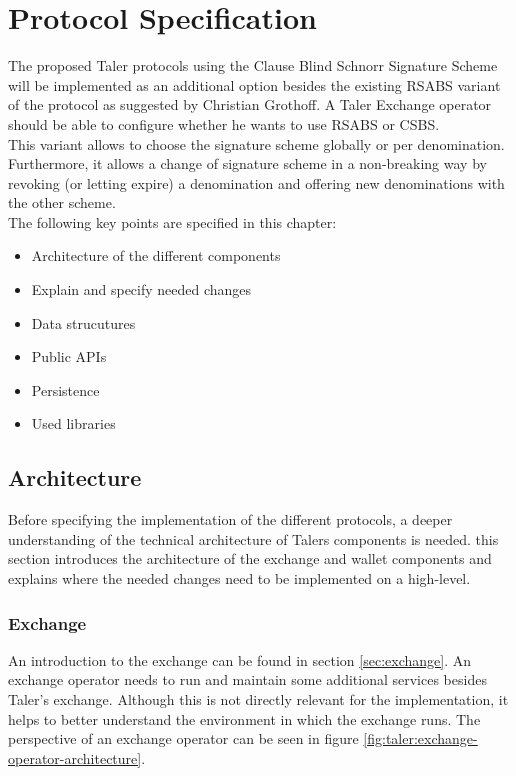 \chapter{Protocol Specification}
\label{chap:spec}
The proposed Taler protocols using the Clause Blind Schnorr Signature Scheme will be implemented as an additional option besides the existing \gls{RSABS} variant of the protocol as suggested by Christian Grothoff.
A Taler Exchange operator should be able to configure whether he wants to use \gls{RSABS} or \gls{CSBS}.
\\This variant allows to choose the signature scheme globally or per denomination.
Furthermore, it allows a change of signature scheme in a non-breaking way by revoking (or letting expire) a denomination and offering new denominations with the other scheme.
\\
The following key points are specified in this chapter:
\begin{itemize}
  \item Architecture of the different components
  \item Explain and specify needed changes
  \item Data strucutures
  \item Public \acp{API}
  \item Persistence
  \item Used libraries
\end{itemize}

\section{Architecture}
Before specifying the implementation of the different protocols, a deeper understanding of the technical architecture of Talers components is needed.
this section introduces the architecture of the exchange and wallet components and explains where the needed changes need to be implemented on a high-level.

\subsection{Exchange}
An introduction to the exchange can be found in section \ref{sec:exchange}.
An exchange operator needs to run and maintain some additional services besides Taler's exchange.
Although this is not directly relevant for the implementation, it helps to better understand the environment in which the exchange runs.
The perspective of an exchange operator can be seen in figure \ref{fig:taler:exchange-operator-architecture}.

